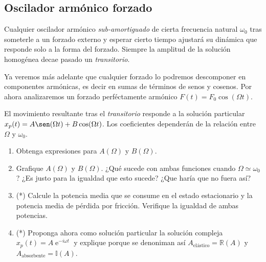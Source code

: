 \subsection*{Oscilador armónico forzado}
\item Cualquier oscilador armónico \emph{sub-amortiguado} de cierta frecuencia natural \(\omega_0\) tras someterle a un forzado externo y esperar cierto tiempo ajustará su dinámica que responde solo a la forma del forzado.
Siempre la amplitud de la solución homogénea decae pasado un \emph{transitorio}. 

Ya veremos más adelante que cualquier forzado lo podremos descomponer en componentes armónicas, es decir en sumas de términos de senos y cosenos.
Por ahora analizaremos un forzado perféctamente armónico \(F(t) = F_0 \cos(\Omega t)\).

El movimiento resultante tras el \emph{transitorio} responde a la solución particular $x_p(t) = A \sen(\Omega t) + B \cos(\Omega t)$.
Los coeficientes dependerán de la relación entre \(\Omega\) y \(\omega_0\).

\begin{enumerate}
	\item Obtenga expresiones para $A(\Omega)$ y $B(\Omega)$.
	\item Grafique $A(\Omega)$ y $B(\Omega)$. ¿Qué sucede con ambas funciones cuando \(\Omega \simeq \omega_0\)? ¿Es justo para la igualdad que esto sucede? ¿Que haría que no fuera así? 
	\item (*) Calcule la potencia media que se consume en el estado estacionario y la potencia media de pérdida por fricción.
	Verifique la igualdad de ambas potencias.
	\item (*) Proponga ahora como solución particular la solución compleja \(x_p(t) = A \operatorname{e}^{-i \omega t}\) y explique porque se denoniman así \(A_\text{elástico} = \mathbb{R} (A)\) y \(A_\text{absorbente} = \mathbb{I} (A)\).
\end{enumerate}



